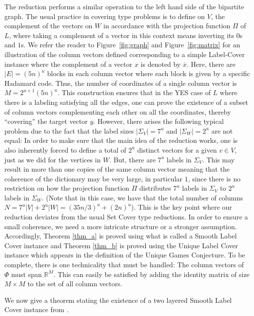 \documentclass[11pt]{article}
\begin{document}
The reduction performs a similar operation to the left hand
side of the bipartite graph. The usual practice in covering
type problems is to define on $V$, the complement of the
vectors on $W$ in accordance with the projection function
$\Pi$ of $L$, where taking a complement of a vector in
this context means inverting its $0$s and $1$s. We refer the
reader to Figure~\ref{fig:graph} and Figure~\ref{fig:matrix}
for an illustration of the column vectors defined corresponding
to a simple  Label-Cover instance where the complement of a
vector $x$ is denoted by $\overline{x}$. Here, there are
$|E| = (5n)^u$ blocks in each column vector where each block
is given by a specific Hadamard code.  Thus, the number of
coordinates of a single column vector is $M = 2^{u+1}(5n)^u$.
This construction ensures that in the YES case of $L$ where
there is a labeling
satisfying all the edges, one can prove the existence of
a subset of column vectors complementing each other on
all the coordinates, thereby ``covering'' the target vector $y$.
However, there arises the following typical problem due
to the fact that the label sizes $|\Sigma_V| = 7^u$ and
$|\Sigma_W|=2^u$ are not equal: In order to make sure that
the main idea of the reduction works, one is also inherently
forced to define a total of $2^u$ distinct vectors for a
given $v \in V$, just as we did for the vertices in $W$.
But, there are $7^u$ labels in $\Sigma_V$. This may result
in more than one copies of the same column vector meaning
that the coherence of the dictionary may be very large,
in particular $1$, since there is no
restriction on how the projection function $\Pi$ distributes
$7^u$ labels in $\Sigma_V$ to $2^u$ labels in $\Sigma_W$.
(Note that in this case, we have that the total number of
columns $N = 7^u|V| + 2^u|W| = (35n/3)^u+(2n)^u$).
This is the key point where our reduction deviates from
the usual Set Cover type reductions. In order to ensure
a small coherence, we need a more intricate structure or
a stronger assumption. Accordingly, Theorem \ref{thm_a}
is proved using what is called a Smooth Label Cover instance
and Theorem \ref{thm_b} is proved using the Unique Label Cover
instance which appears in the definition of the Unique Games Conjecture.
To be complete, there is one technicality that must be handled:
The column vectors of $\Phi$ must span $\mathbb{R}^M$. This
can easily be satisfied by adding the identity matrix
of size $M \times M$ to the set of all column vectors.

We now give a theorem stating the existence of a two layered
Smooth Label Cover instance from \cite{SmoothLC}.
\end{document}
